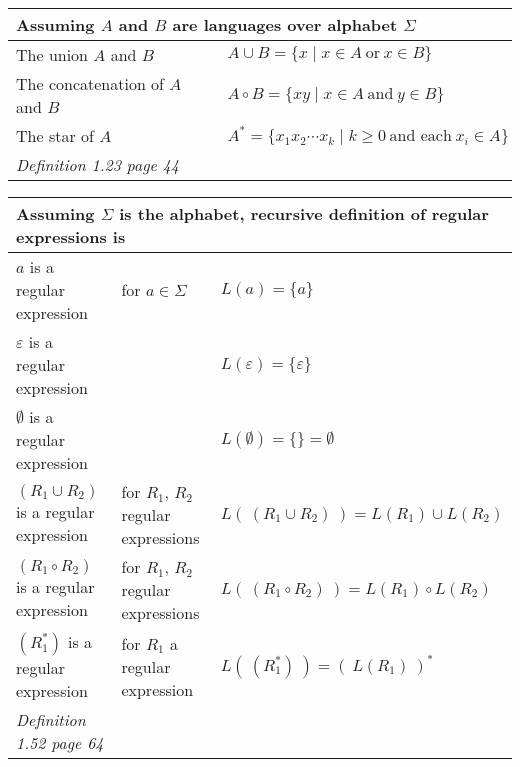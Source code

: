 \documentclass[12pt, oneside]{article}
\begin{document}
    \begin{center}
    \begin{tabular}{|ll|}
    \hline
    \multicolumn{2}{|l|}{Assuming $A$ and $B$  are languages  over alphabet $\Sigma$}\\
    \hline
    The union $A$ and $B$   & $A \cup B = \{  x \mid x \in A~\text{or}~x  \in  B \}$ \\
    The concatenation of $A$ and $B$   & $A \circ B = \{  xy \mid x \in A~\text{and}~y  \in  B \} $ \\
    The star of $A$ & $A^* = \{ x_1 x_2 \cdots  x_k \mid k  \geq 0 ~\text{and each}~x_i \in A \}$ \\
    \hline
    {\it Definition 1.23 page 44} & \\
    \hline
    \end{tabular}
    \end{center}
    
    
    
    \begin{center}
    \begin{tabular}{|lll|}
    \hline
    \multicolumn{3}{|l|}{Assuming $\Sigma$ is the alphabet, recursive definition of regular expressions is}\\
    \hline
    $a$ is a regular expression  & for $a \in \Sigma$ & $L(a) = \{a\}$ \\
    $\varepsilon$ is a regular expression   & & $L(\varepsilon) = \{ \varepsilon \}$ \\
    $\emptyset$ is a regular expression  & & $L(\emptyset) = \{\} =  \emptyset$ \\
    $(R_1 \cup R_2)$ is a regular expression & for  $R_1$, $R_2$ regular expressions & 
    $L( ~(R_1\cup R_2) ~)  =
    L(R_1) \cup L(R_2)$ \\
    $(R_1 \circ R_2)$ is a regular expression & for  $R_1$, $R_2$ regular expressions & 
    $L( ~(R_1\circ R_2) ~)  =
    L(R_1) \circ L(R_2)$ \\
    $(R_1^*)$ is a regular expression & for  $R_1$ a regular expression & $L( ~(R_1^*) ~)  = (~L(R_1) ~)^*$ \\
    \hline
    {\it Definition 1.52 page 64} & & \\
    \hline
    \end{tabular}
    \end{center}
    
\end{document}

